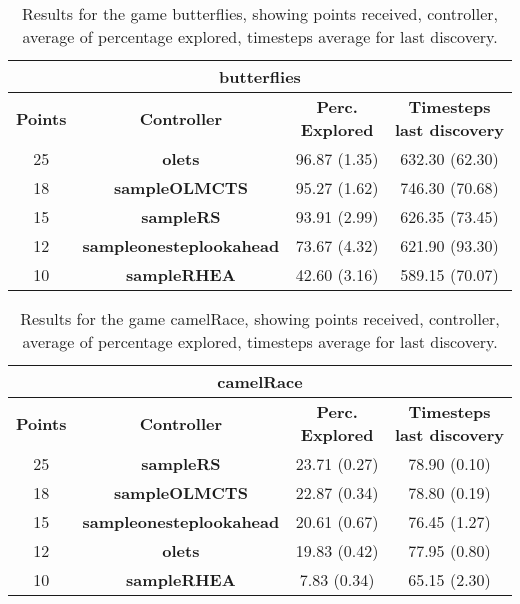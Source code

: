 \begin{table*}[!t]
\begin{center}
\begin{tabular}{|c|c|c|c|}
\multicolumn{4}{c}{\textbf{butterflies}}\\
\hline
\textbf{Points} & \textbf{Controller} & \textbf{Perc. Explored} &  \textbf{Timesteps last discovery}\\
\hline
25 & \textbf{olets} & 96.87 (1.35) & 632.30 (62.30)
 \\
\hline
18 & \textbf{sampleOLMCTS} & 95.27 (1.62) & 746.30 (70.68)
 \\
\hline
15 & \textbf{sampleRS} & 93.91 (2.99) & 626.35 (73.45)
 \\
\hline
12 & \textbf{sampleonesteplookahead} & 73.67 (4.32) & 621.90 (93.30)
 \\
\hline
10 & \textbf{sampleRHEA} & 42.60 (3.16) & 589.15 (70.07)
 \\
\hline
\end{tabular}
\caption{Results for the game butterflies, showing points received, controller, average of percentage explored, timesteps average for last discovery.}
\label{tab:weights}
\end{center}
\end{table*}
\begin{table*}[!t]
\begin{center}
\begin{tabular}{|c|c|c|c|}
\multicolumn{4}{c}{\textbf{camelRace}}\\
\hline
\textbf{Points} & \textbf{Controller} & \textbf{Perc. Explored} &  \textbf{Timesteps last discovery}\\
\hline
25 & \textbf{sampleRS} & 23.71 (0.27) & 78.90 (0.10)
 \\
\hline
18 & \textbf{sampleOLMCTS} & 22.87 (0.34) & 78.80 (0.19)
 \\
\hline
15 & \textbf{sampleonesteplookahead} & 20.61 (0.67) & 76.45 (1.27)
 \\
\hline
12 & \textbf{olets} & 19.83 (0.42) & 77.95 (0.80)
 \\
\hline
10 & \textbf{sampleRHEA} & 7.83 (0.34) & 65.15 (2.30)
 \\
\hline
\end{tabular}
\caption{Results for the game camelRace, showing points received, controller, average of percentage explored, timesteps average for last discovery.}
\label{tab:weights}
\end{center}
\end{table*}

